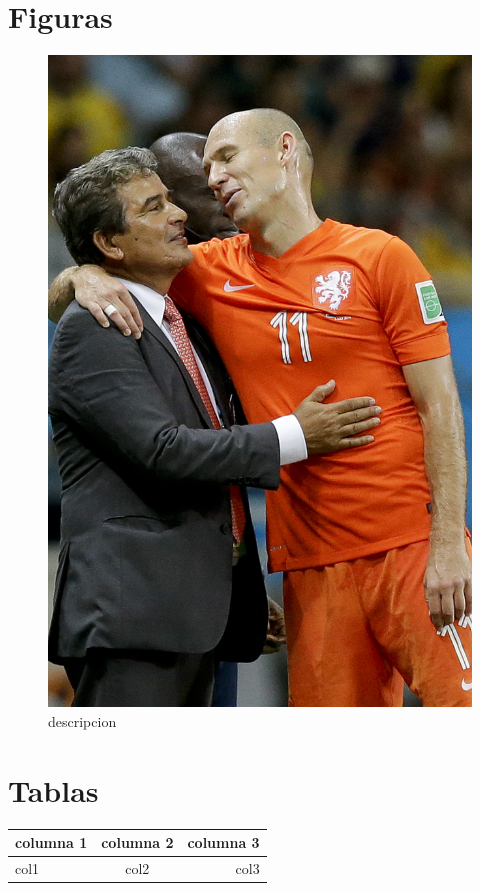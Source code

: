 \documentclass{article}
\begin{document}
\section{Figuras}
\begin{figure}[h]
\centering
\includegraphics[width= 3.0 in]{201407051737634371468-p5.jpg}
\caption{descripcion}
\label{etiqueta_figura}
\end{figure}

\section{Tablas}

\begin{tabular} { | | l | c | r | | }

\hline
\hline

columna 1 & columna 2 & columna 3 \\

\hline

col1 & col2 & col3 \\

\hline

\end{tabular}
\end{document}
